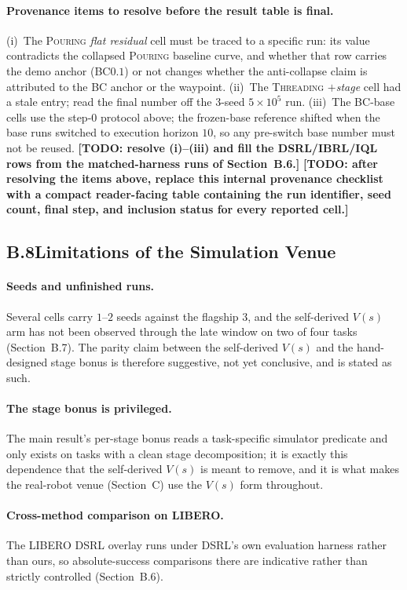 \documentclass[letterpaper]{article} %
\newcommand{\todo}[1]{\textbf{[TODO: #1]}}
\begin{document}
\paragraph{Provenance items to resolve before the result table is final.}
(i)~The \textsc{Pouring} \emph{flat residual} cell must be traced to a specific run:
its value contradicts the collapsed \textsc{Pouring} baseline curve, and whether that
row carries the demo anchor (BC$0.1$) or not changes whether the anti-collapse claim
is attributed to the BC anchor or the waypoint.
(ii)~The \textsc{Threading} \emph{$+$stage} cell had a stale entry; read the final
number off the $3$-seed $5{\times}10^{5}$ run.
(iii)~The BC-base cells use the step-$0$ protocol above; the frozen-base reference
shifted when the base runs switched to execution horizon $10$, so any pre-switch base
number must not be reused. \todo{resolve (i)--(iii) and fill the DSRL/IBRL/IQL rows
from the matched-harness runs of Section~B.6.}
\todo{after resolving the items above, replace this internal provenance checklist with a
compact reader-facing table containing the run identifier, seed count, final step, and
inclusion status for every reported cell.}

\subsection{B.8\quad Limitations of the Simulation Venue}

\paragraph{Seeds and unfinished runs.}
Several cells carry $1$--$2$ seeds against the flagship $3$, and the self-derived
$V(s)$ arm has not been observed through the late window on two of four tasks
(Section~B.7). The parity claim between the self-derived $V(s)$ and the hand-designed
stage bonus is therefore suggestive, not yet conclusive, and is stated as such.

\paragraph{The stage bonus is privileged.}
The main result's per-stage bonus reads a task-specific simulator predicate and only
exists on tasks with a clean stage decomposition; it is exactly this dependence that
the self-derived $V(s)$ is meant to remove, and it is what makes the real-robot venue
(Section~C) use the $V(s)$ form throughout.

\paragraph{Cross-method comparison on LIBERO.}
The LIBERO DSRL overlay runs under DSRL's own evaluation harness rather than ours, so
absolute-success comparisons there are indicative rather than strictly controlled
(Section~B.6).
\end{document}
